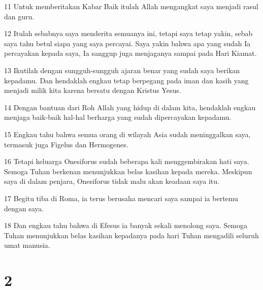 \par 11 Untuk memberitakan Kabar Baik itulah Allah mengangkat saya menjadi rasul dan guru.
\par 12 Itulah sebabnya saya menderita semuanya ini, tetapi saya tetap yakin, sebab saya tahu betul siapa yang saya percayai. Saya yakin bahwa apa yang sudah Ia percayakan kepada saya, Ia sanggup juga menjaganya sampai pada Hari Kiamat.
\par 13 Ikutilah dengan sungguh-sungguh ajaran benar yang sudah saya berikan kepadamu. Dan hendaklah engkau tetap berpegang pada iman dan kasih yang menjadi milik kita karena bersatu dengan Kristus Yesus.
\par 14 Dengan bantuan dari Roh Allah yang hidup di dalam kita, hendaklah engkau menjaga baik-baik hal-hal berharga yang sudah dipercayakan kepadamu.
\par 15 Engkau tahu bahwa semua orang di wilayah Asia sudah meninggalkan saya, termasuk juga Figelus dan Hermogenes.
\par 16 Tetapi keluarga Onesiforus sudah beberapa kali menggembirakan hati saya. Semoga Tuhan berkenan menunjukkan belas kasihan kepada mereka. Meskipun saya di dalam penjara, Onesiforus tidak malu akan keadaan saya itu.
\par 17 Begitu tiba di Roma, ia terus berusaha mencari saya sampai ia bertemu dengan saya.
\par 18 Dan engkau tahu bahwa di Efesus ia banyak sekali menolong saya. Semoga Tuhan menunjukkan belas kasihan kepadanya pada hari Tuhan mengadili seluruh umat manusia.

\chapter{2}

